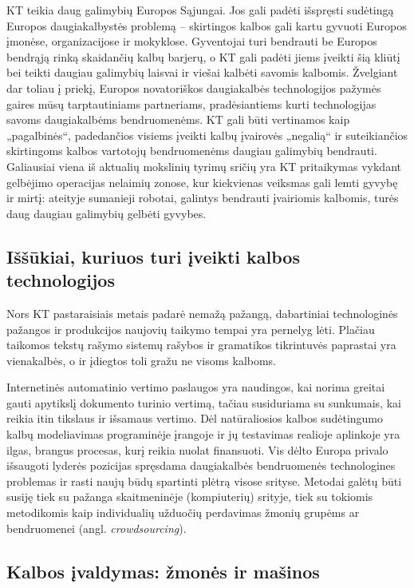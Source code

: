 \documentclass[]{../metanetpaper}
\begin{document}
\begin{multicols}{2}
KT teikia daug galimybių Europos Sąjungai. Jos gali padėti išspręsti sudėtingą Europos daugiakalbystės problemą – skirtingos kalbos gali kartu gyvuoti Europos įmonėse, organizacijose ir mokyklose. Gyventojai turi bendrauti be Europos bendrąją rinką skaidančių kalbų barjerų, o KT gali padėti jiems įveikti šią  kliūtį bei teikti daugiau galimybių laisvai ir viešai kalbėti savomis kalbomis. Žvelgiant dar toliau į priekį, Europos novatoriškos daugiakalbės technologijos pažymės gaires mūsų tarptautiniams partneriams, pradėsiantiems kurti technologijas savoms daugiakalbėms bendruomenėms. KT gali būti vertinamos kaip „pagalbinės“, padedančios visiems įveikti kalbų įvairovės „negalią“ ir suteikiančios skirtingoms kalbos vartotojų bendruomenėms daugiau galimybių bendrauti. Galiausiai viena iš aktualių mokslinių tyrimų sričių yra KT pritaikymas vykdant gelbėjimo operacijas nelaimių zonose, kur kiekvienas veiksmas gali lemti gyvybę ir mirtį: ateityje sumanieji robotai, galintys bendrauti įvairiomis kalbomis, turės daug daugiau galimybių gelbėti gyvybes. 

\subsection{Iššūkiai, kuriuos turi įveikti kalbos technologijos}

Nors KT pastaraisiais metais padarė nemažą pažangą, dabartiniai technologinės pažangos ir produkcijos naujovių taikymo tempai yra pernelyg lėti. Plačiau taikomos tekstų rašymo sistemų rašybos ir gramatikos tikrintuvės paprastai yra vienakalbės, o ir įdiegtos toli gražu ne visoms kalboms.


Internetinės automatinio vertimo paslaugos yra naudingos, kai norima greitai gauti apytikslį dokumento turinio vertimą, tačiau susiduriama su sunkumais, kai reikia itin tikslaus ir išsamaus vertimo. Dėl natūraliosios kalbos sudėtingumo kalbų modeliavimas programinėje įrangoje ir jų testavimas realioje aplinkoje yra ilgas, brangus procesas, kurį reikia nuolat finansuoti. Vis dėlto Europa privalo išsaugoti lyderės pozicijas spręsdama daugiakalbės bendruomenės technologines problemas ir rasti naujų būdų spartinti plėtrą visose srityse. Metodai galėtų būti susiję tiek su pažanga skaitmeninėje (kompiuterių) srityje, tiek su tokiomis metodikomis kaip individualių užduočių perdavimas žmonių grupėms ar bendruomenei (angl. \textit{crowdsourcing}).

\subsection{Kalbos įvaldymas: žmonės ir mašinos}


\end{multicols}
\end{document}
